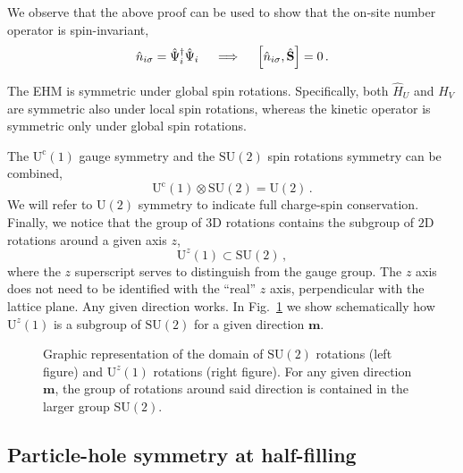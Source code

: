 %
We observe that the above proof can be used to show that the on-site number operator is spin-invariant,
\begin{equation}\label{eq:ehm-n-spin}
	\hat n_{i\sigma} = \hat \Psi_i^\dagger \hat \Psi_i 
	\quad\implies\quad
	\comm{\hat n_{i\sigma}}{\hat{\mathbf{S}}} = 0 \, .
\end{equation}

The EHM is symmetric under global spin rotations. Specifically, both $\hat H_U$ and $\hat H_V$ are symmetric also under local spin rotations, whereas the kinetic operator is symmetric only under global spin rotations.

The $\mathrm{U}^\mathrm{c}(1)$ gauge symmetry and the $\mathrm{SU}(2)$ spin rotations symmetry can be combined,
\[
	\mathrm{U}^\mathrm{c}(1) \otimes \mathrm{SU}(2) = \mathrm{U}(2) \, .
\]
We will refer to $\mathrm{U}(2)$ symmetry to indicate full charge-spin conservation. Finally, we notice that the group of $3$D rotations contains the subgroup of $2$D rotations around a given axis $z$,
\[
	\mathrm{U}^z(1) \subset \mathrm{SU}(2) \, ,
\]
where the $z$ superscript serves to distinguish from the gauge group. The $z$ axis does not need to be identified with the ``real'' $z$ axis, perpendicular with the lattice plane. Any given direction works. In Fig.~\ref{fig:su2-u1-domains} we show schematically how $\mathrm{U}^z(1)$ is a subgroup of $\mathrm{SU}(2)$ for a given direction $\mathbf{m}$.

\begin{figure}
	\centering
	\hspace{2em}
	\caption{Graphic representation of the domain of $\mathrm{SU}(2)$ rotations (left figure) and $\mathrm{U}^z(1)$ rotations (right figure). For any given direction $\mathbf{m}$, the group of rotations around said direction is contained in the larger group $\mathrm{SU}(2)$.}
	\label{fig:su2-u1-domains}
\end{figure}

\subsection{Particle-hole symmetry at half-filling}\label{subsec:phs}

